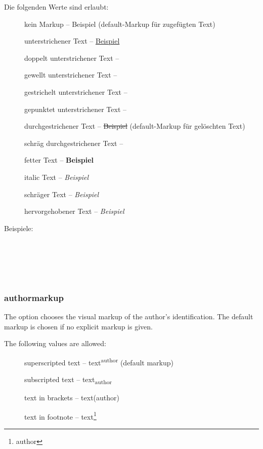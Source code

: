 		Die folgenden Werte sind erlaubt:
		\begin{description}
			\item [] kein Markup -- Beispiel (default-Markup für zugefügten Text)
			\item [] unterstrichener Text -- \uline{Beispiel}
			\item [] doppelt unterstrichener Text -- 
			\item [] gewellt unterstrichener Text -- 
			\item [] gestrichelt unterstrichener Text -- 
			\item [] gepunktet unterstrichener Text -- 
			\item [] durchgestrichener Text -- \sout{Beispiel} (default-Markup für gelöschten Text)
			\item [] schräg durchgestrichener Text -- 
			\item [] fetter Text -- \textbf{Beispiel}
			\item [] italic Text -- \textit{Beispiel}
			\item [] schräger Text -- \textsl{Beispiel}
			\item [] hervorgehobener Text -- \emph{Beispiel}
		\end{description}

		Beispiele:
	\fi

\\
\\
\\
\\



\subsubsection{authormarkup}
\ifENGLISH
	The  option chooses the visual markup of the author's identification.
	The default markup is chosen if no explicit markup is given.

	The following values are allowed:
	\begin{description}
		\item [] superscripted text -- text\textsuperscript{author} (default markup)
		\item [] subscripted text -- text\textsubscript{author}
		\item [] text in brackets -- text(author)
		\item [] text in footnote -- text\footnote{author}
	\end{description}

